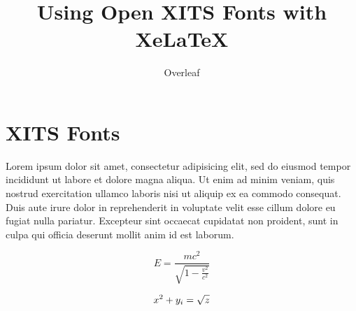 \documentclass[12pt]{article}
\begin{document}
\title{Using Open XITS Fonts with XeLaTeX}
\author{Overleaf}
\maketitle

\section{XITS Fonts}

Lorem ipsum dolor sit amet, consectetur adipisicing elit, sed do eiusmod tempor incididunt ut labore et dolore magna aliqua. Ut enim ad minim veniam, quis nostrud exercitation ullamco laboris nisi ut aliquip ex ea commodo consequat. Duis aute irure dolor in reprehenderit in voluptate velit esse cillum dolore eu fugiat nulla pariatur. Excepteur sint occaecat cupidatat non proident, sunt in culpa qui officia deserunt mollit anim id est laborum.

\begin{equation}
  E = \frac{mc^2}{\sqrt{1-\frac{v^2}{c^2}}}
\end{equation}

\begin{equation}
\boldmath x^2 + y_i = \sqrt{z}
\end{equation}
\end{document}
